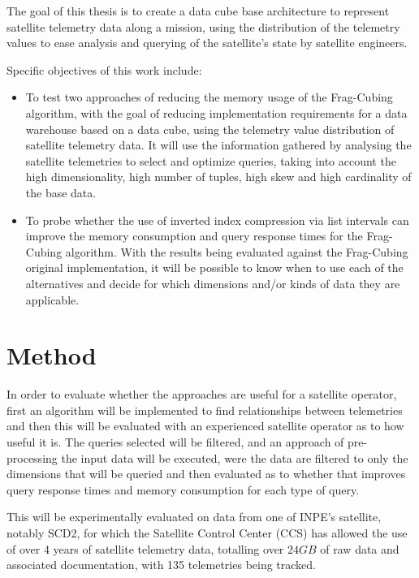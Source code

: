 The goal of this thesis is to create a data cube base architecture to represent satellite telemetry data along a mission, using the distribution of the telemetry values to ease analysis and querying of the satellite's state by satellite engineers.

Specific objectives of this work include:

\begin{itemize}[noitemsep]
  \item To test two approaches of reducing the memory usage of the Frag-Cubing algorithm, with the goal of reducing implementation requirements for a data warehouse based on a data cube, using the telemetry value distribution of satellite telemetry data.
It will use the information gathered by analysing the satellite telemetries to select and optimize queries, taking into account the high dimensionality, high number of tuples, high skew and high cardinality of the base data.
  \item To probe whether the use of inverted index compression via list intervals can improve the memory consumption and query response times for the Frag-Cubing algorithm.
  With the results being evaluated against the Frag-Cubing original implementation, it will be possible to know when to use each of the alternatives and decide for which dimensions and/or kinds of data they are applicable.
\end{itemize}

\section{Method}\label{ch:intro:method}

In order to evaluate whether the approaches are useful for a satellite operator, first an algorithm will be implemented to find relationships between telemetries and then this will be evaluated with an experienced satellite operator as to how useful it is.
The queries selected will be filtered, and an approach of pre-processing the input data will be executed, were the data are filtered to only the dimensions that will be queried and then evaluated as to whether that improves query response times and memory consumption for each type of query.

This will be experimentally evaluated on data from one of INPE's satellite, notably SCD2, for which the Satellite Control Center (CCS) has allowed the use of over 4 years of satellite telemetry data, totalling over $24GB$ of raw data and associated documentation, with 135 telemetries being tracked.


